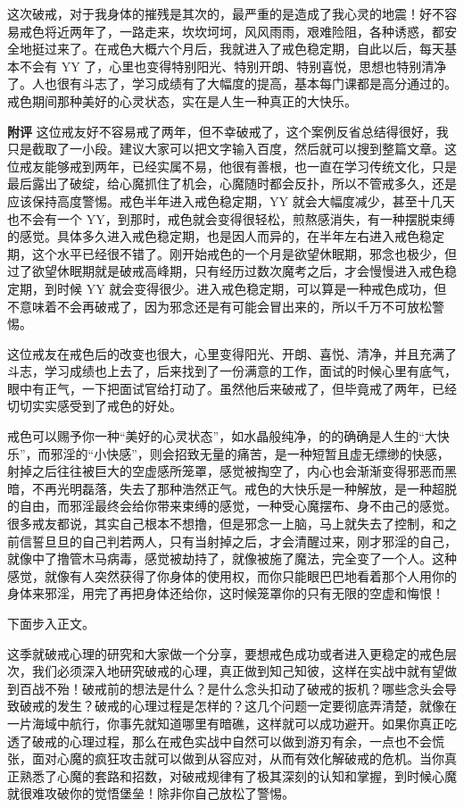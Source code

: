 \begin{case}\label{76case9}
    这次破戒，对于我身体的摧残是其次的，最严重的是造成了我心灵的地震！好不容易戒色将近两年了，一路走来，坎坎坷坷，风风雨雨，艰难险阻，各种诱惑，都安全地挺过来了。在戒色大概六个月后，我就进入了戒色稳定期，自此以后，每天基本不会有 YY 了，心里也变得特别阳光、特别开朗、特别喜悦，思想也特别清净了。人也很有斗志了，学习成绩有了大幅度的提高，基本每门课都是高分通过的。戒色期间那种美好的心灵状态，实在是人生一种真正的大快乐。

    \textbf{附评} 这位戒友好不容易戒了两年，但不幸破戒了，这个案例反省总结得很好，我只是截取了一小段。建议大家可以把文字输入百度，然后就可以搜到整篇文章。这位戒友能够戒到两年，已经实属不易，他很有善根，也一直在学习传统文化，只是最后露出了破绽，给心魔抓住了机会，心魔随时都会反扑，所以不管戒多久，还是应该保持高度警惕。戒色半年进入戒色稳定期，YY 就会大幅度减少，甚至十几天也不会有一个 YY，到那时，戒色就会变得很轻松，煎熬感消失，有一种摆脱束缚的感觉。具体多久进入戒色稳定期，也是因人而异的，在半年左右进入戒色稳定期，这个水平已经很不错了。刚开始戒色的一个月是欲望休眠期，邪念也极少，但过了欲望休眠期就是破戒高峰期，只有经历过数次魔考之后，才会慢慢进入戒色稳定期，到时候 YY 就会变得很少。进入戒色稳定期，可以算是一种戒色成功，但不意味着不会再破戒了，因为邪念还是有可能会冒出来的，所以千万不可放松警惕。

    这位戒友在戒色后的改变也很大，心里变得阳光、开朗、喜悦、清净，并且充满了斗志，学习成绩也上去了，后来找到了一份满意的工作，面试的时候心里有底气，眼中有正气，一下把面试官给打动了。虽然他后来破戒了，但毕竟戒了两年，已经切切实实感受到了戒色的好处。

    戒色可以赐予你一种“美好的心灵状态”，如水晶般纯净，的的确确是人生的“大快乐”，而邪淫的“小快感”，则会招致无量的痛苦，是一种短暂且虚无缥缈的快感，射掉之后往往被巨大的空虚感所笼罩，感觉被掏空了，内心也会渐渐变得邪恶而黑暗，不再光明磊落，失去了那种浩然正气。戒色的大快乐是一种解放，是一种超脱的自由，而邪淫最终会给你带来束缚的感觉，一种受心魔摆布、身不由己的感觉。很多戒友都说，其实自己根本不想撸，但是邪念一上脑，马上就失去了控制，和之前信誓旦旦的自己判若两人，只有当射掉之后，才会清醒过来，刚才邪淫的自己，就像中了撸管木马病毒，感觉被劫持了，就像被施了魔法，完全变了一个人。这种感觉，就像有人突然获得了你身体的使用权，而你只能眼巴巴地看着那个人用你的身体来邪淫，用完了再把身体还给你，这时候笼罩你的只有无限的空虚和悔恨！
\end{case}

下面步入正文。

这季就破戒心理的研究和大家做一个分享，要想戒色成功或者进入更稳定的戒色层次，我们必须深入地研究破戒的心理，真正做到知己知彼，这样在实战中就有望做到百战不殆！破戒前的想法是什么？是什么念头扣动了破戒的扳机？哪些念头会导致破戒的发生？破戒的心理过程是怎样的？这几个问题一定要彻底弄清楚，就像在一片海域中航行，你事先就知道哪里有暗礁，这样就可以成功避开。如果你真正吃透了破戒的心理过程，那么在戒色实战中自然可以做到游刃有余，一点也不会慌张，面对心魔的疯狂攻击就可以做到从容应对，从而有效化解破戒的危机。当你真正熟悉了心魔的套路和招数，对破戒规律有了极其深刻的认知和掌握，到时候心魔就很难攻破你的觉悟堡垒！除非你自己放松了警惕。

